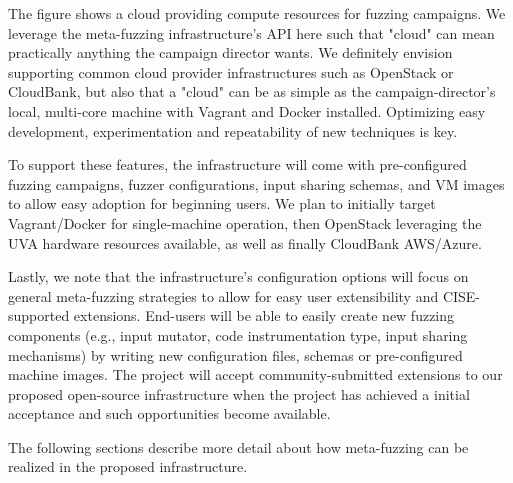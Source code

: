 The figure shows a cloud providing compute resources for fuzzing campaigns.  
We leverage the meta-fuzzing infrastructure's API here such that "cloud" can 
mean practically anything the campaign director wants.  We definitely envision
supporting common cloud provider infrastructures such as OpenStack or CloudBank, but
also that a "cloud" can be as simple as the campaign-director's local, multi-core machine 
with Vagrant and Docker installed.  Optimizing easy development, experimentation and repeatability
of new techniques is key. 

To support these features, the infrastructure will come with pre-configured 
fuzzing campaigns, fuzzer configurations, input sharing schemas, and VM images to allow easy adoption for 
beginning users.  We plan to initially target Vagrant/Docker for single-machine operation, then OpenStack leveraging the UVA 
hardware resources available, as well as finally CloudBank AWS/Azure.

Lastly, we note that the infrastructure's configuration options will focus on general meta-fuzzing strategies 
to allow for easy user extensibility and CISE-supported extensions.  
End-users will be able to easily create 
new fuzzing components (e.g., input mutator, code instrumentation type, input 
sharing mechanisms) by writing new configuration files, schemas or 
pre-configured machine images.  The project will accept 
community-submitted extensions to our proposed open-source infrastructure when 
the project has achieved a initial acceptance and such opportunities become available.



The following sections describe more detail about how meta-fuzzing can be realized 
in the proposed infrastructure.


